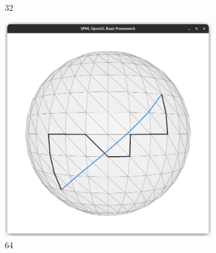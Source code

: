 \documentclass{stdlocal}
\begin{document}
\begin{figure}
\begin{subfigure}[b]{0.24\linewidth}
    \caption{32}
  \end{subfigure}
  \begin{subfigure}[b]{0.24\linewidth}
    \centering
    \includegraphics[width=\linewidth,trim={25px 20 25 50},clip]{images/sphere-geodesic-1-iteration-64.png}
    \caption{64}
  \end{subfigure}
  \caption[]{}
  \label{fig:}
\end{figure}
\end{document}
